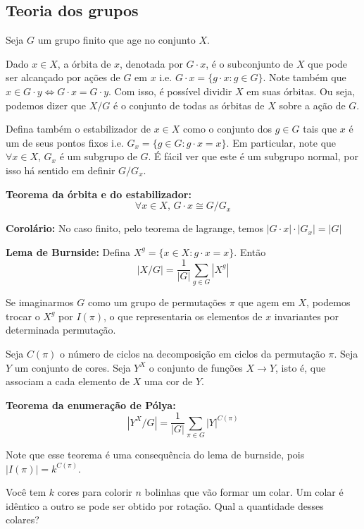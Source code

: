 \subsection{Teoria dos grupos}

Seja $G$ um grupo finito que age no conjunto $X$.

Dado $x \in X$, a órbita de $x$, denotada por $G \cdot x$, é o subconjunto de $X$ que pode ser alcançado por ações de $G$ em $x$ i.e. $G \cdot x = \{g \cdot x : g \in G \}$. Note também que $x \in G \cdot y \Longleftrightarrow G \cdot x = G \cdot y$. Com isso, é possível dividir $X$ em suas órbitas. Ou seja, podemos dizer que $X/G$ é o conjunto de todas as órbitas de $X$ sobre a ação de $G$. 

Defina também o estabilizador de $x \in X$ como o conjunto dos $g \in G$ tais que $x$ é um de seus pontos fixos i.e. $G_x = \{g \in G : g \cdot x = x\}$. Em particular, note que $\forall x \in X$, $G_x$ é um subgrupo de $G$. É fácil ver que este é um subgrupo normal, por isso há sentido em definir $G / G_x$. 

\textbf{Teorema da órbita e do estabilizador:} $$ \forall x \in X, \, G \cdot x \cong G/G_x$$

\textbf{Corolário:} No caso finito, pelo teorema de lagrange, temos $|G \cdot x| \cdot |G_x| = |G|$

\textbf{Lema de Burnside:} Defina $X^g = \{x \in X : g \cdot x = x \}$. Então
$$ |X/G| = \dfrac{1}{|G|} \sum\limits_{g \in G} |X^g|$$

Se imaginarmos $G$ como um grupo de permutações $\pi$ que agem em $X$, podemos trocar o $X^g$ por $I(\pi)$, o que representaria os elementos de $x$ invariantes por determinada permutação.

Seja $C(\pi)$ o número de ciclos na decomposição em ciclos da permutação $\pi$. Seja $Y$ um conjunto de cores. Seja $Y^X$ o conjunto de funções $X \to Y$, isto é, que associam a cada elemento de $X$ uma cor de $Y$.

\textbf{Teorema da enumeração de Pólya:}
$$|Y^X/G| = \dfrac{1}{|G|} \sum\limits_{\pi \in G} |Y|^{C(\pi)}$$

Note que esse teorema é uma consequência do lema de burnside, pois $|I(\pi)| = k^{C(\pi)}$.

 Você tem $k$ cores para colorir $n$ bolinhas que vão formar um colar. Um colar é idêntico a outro se pode ser obtido por rotação. Qual a quantidade desses colares?

